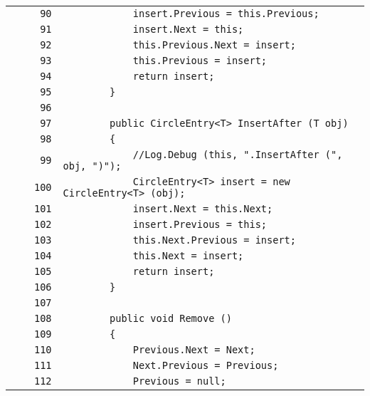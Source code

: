 \documentclass[a4paper,10pt]{article}
\begin{document}
\begin{longtable}[l]{lrrl}
\cellcolor{gray} &  & \verb~90~ & \verb~            insert.Previous = this.Previous;~\\
\cellcolor{gray} &  & \verb~91~ & \verb~            insert.Next = this;~\\
\cellcolor{gray} &  & \verb~92~ & \verb~            this.Previous.Next = insert;~\\
\cellcolor{gray} &  & \verb~93~ & \verb~            this.Previous = insert;~\\
\cellcolor{gray} &  & \verb~94~ & \verb~            return insert;~\\
\cellcolor{gray} &  & \verb~95~ & \verb~        }~\\
\cellcolor{gray} &  & \verb~96~ & \verb~~\\
\cellcolor{gray} &  & \verb~97~ & \verb~        public CircleEntry<T> InsertAfter (T obj)~\\
\cellcolor{gray} &  & \verb~98~ & \verb~        {~\\
\cellcolor{gray} &  & \verb~99~ & \verb~            //Log.Debug (this, ".InsertAfter (", obj, ")");~\\
\cellcolor{gray} &  & \verb~100~ & \verb~            CircleEntry<T> insert = new CircleEntry<T> (obj);~\\
\cellcolor{gray} &  & \verb~101~ & \verb~            insert.Next = this.Next;~\\
\cellcolor{gray} &  & \verb~102~ & \verb~            insert.Previous = this;~\\
\cellcolor{gray} &  & \verb~103~ & \verb~            this.Next.Previous = insert;~\\
\cellcolor{gray} &  & \verb~104~ & \verb~            this.Next = insert;~\\
\cellcolor{gray} &  & \verb~105~ & \verb~            return insert;~\\
\cellcolor{gray} &  & \verb~106~ & \verb~        }~\\
\cellcolor{gray} &  & \verb~107~ & \verb~~\\
\cellcolor{gray} &  & \verb~108~ & \verb~        public void Remove ()~\\
\cellcolor{gray} &  & \verb~109~ & \verb~        {~\\
\cellcolor{gray} &  & \verb~110~ & \verb~            Previous.Next = Next;~\\
\cellcolor{gray} &  & \verb~111~ & \verb~            Next.Previous = Previous;~\\
\cellcolor{gray} &  & \verb~112~ & \verb~            Previous = null;~\\

\end{longtable}
\end{document}
